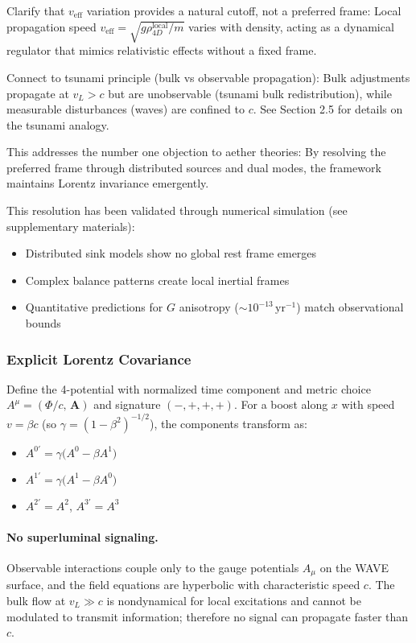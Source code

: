 Clarify that $v_{\text{eff}}$ variation provides a natural cutoff, not a preferred frame: Local propagation speed $v_{\text{eff}} = \sqrt{g \rho_{4D}^{\text{local}} / m}$ varies with density, acting as a dynamical regulator that mimics relativistic effects without a fixed frame.

Connect to tsunami principle (bulk vs observable propagation): Bulk adjustments propagate at $v_L > c$ but are unobservable (tsunami bulk redistribution), while measurable disturbances (waves) are confined to $c$. See Section 2.5 for details on the tsunami analogy.

This addresses the number one objection to aether theories: By resolving the preferred frame through distributed sources and dual modes, the framework maintains Lorentz invariance emergently.

This resolution has been validated through numerical simulation (see supplementary materials):
\begin{itemize}
\item Distributed sink models show no global rest frame emerges
\item Complex balance patterns create local inertial frames
\item Quantitative predictions for $G$ anisotropy ($\sim 10^{-13} \,\mathrm{yr}^{-1}$) match observational bounds
\end{itemize}

\subsubsection{Explicit Lorentz Covariance}
Define the 4-potential with normalized time component and metric choice
$A^\mu=(\Phi/c,\,\mathbf A)$ and signature $(-,+,+,+)$. For a boost along $x$ with speed $v=\beta c$ (so $\gamma=(1-\beta^2)^{-1/2}$), the components transform as:
\begin{itemize}
\item $A^{0'} = \gamma\big(A^0 - \beta A^1\big)$
\item $A^{1'} = \gamma\big(A^1 - \beta A^0\big)$
\item $A^{2'} = A^2$, $A^{3'} = A^3$
\end{itemize}

\paragraph{No superluminal signaling.} Observable interactions couple only to the gauge potentials $A_\mu$ on the WAVE surface, and the field equations are hyperbolic with characteristic speed $c$. The bulk flow at $v_L\gg c$ is nondynamical for local excitations and cannot be modulated to transmit information; therefore no signal can propagate faster than $c$.

